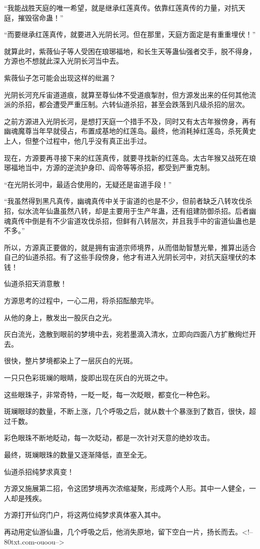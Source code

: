 \begin{this_body}
“我能战胜天庭的唯一希望，就是继承红莲真传。依靠红莲真传的力量，对抗天庭，摧毁宿命蛊！”

“而要继承红莲真传，就要进入光阴长河。但在那里，天庭方面定是有重重埋伏！”

就算此时，紫薇仙子等人受困在琅琊福地，和长生天等蛊仙强者交手，脱不得身，方源也不想就此深入光阴长河当中去。

紫薇仙子怎可能会出现这样的纰漏？

光阴长河充斥宙道道痕，就算至尊仙体不受道痕掣肘，但方源发出来的任何其他流派的杀招，都会遭受严重压制。六转仙道杀招，甚至会跌落到凡级杀招的层次。

之前方源进入光阴长河，是想打天庭一个措手不及，同时又有太古年猴傍身，再有幽魂魔尊当年早就侵占，布置成基地的红莲岛。最终，他消耗掉红莲岛，杀死黄史上人，但整个过程中，他几乎没有真正出手过。

现在，方源要再寻接下来的红莲真传，就要寻找新的红莲岛。太古年猴又战死在琅琊福地当中，方源的逆流护身印、阎帝等等杀招，都受到严重克制。

“在光阴长河中，最适合使用的，无疑还是宙道手段！”

“我虽然得到黑凡真传，幽魂真传中关于宙道的也是不少，但前者缺乏八转攻伐杀招，似水流年仙蛊虽然八转，却是主要用于生产年蛊，还有组建防御杀招。后者幽魂真传中倒是有不少宙道攻伐杀招，但鲜有八转层次，并且我手中的宙道仙蛊也是不多。”

所以，方源真正要做的，就是拥有宙道宗师境界，从而借助智慧光晕，推算出适合自己的仙道杀招。有了这些手段傍身，他才有进入光阴长河中，对抗天庭埋伏的本钱！

仙道杀招天消意散！

方源思考的过程中，一心二用，将杀招酝酿完毕。

从他的身上，散发出一股灰白之光。

灰白流光，逸散到眼前的梦境中去，宛若墨滴入清水，立即向四面八方扩散绚烂开去。

很快，整片梦境都染上了一层灰白的光斑。

一只只色彩斑斓的眼睛，旋即出现在灰白的光斑之中。

这些眼珠子，非常奇特，一眨一眨，每一次眨眼，都变化一种色彩。

斑斓眼球的数量，不断上涨，几个呼吸之后，就从数十个暴涨到了数百，很快，超过千数。

彩色眼珠不断地眨动，每一次眨动，都是一次针对天意的绝妙攻击。

最终，斑斓眼珠的数量又逐渐降低，直至全无。

仙道杀招纯梦求真变！

方源又施展第二招，令这团梦境再次浓缩凝聚，形成两个人形。其中一人健全，一人却是残疾。

方源打开仙窍门户，将这两位纯梦求真体塞入其中。

再动用定仙游仙蛊，几个呼吸之后，他消失原地，留下空白一片，扬长而去。<!--80txt.com-ouoou-->

\end{this_body}

